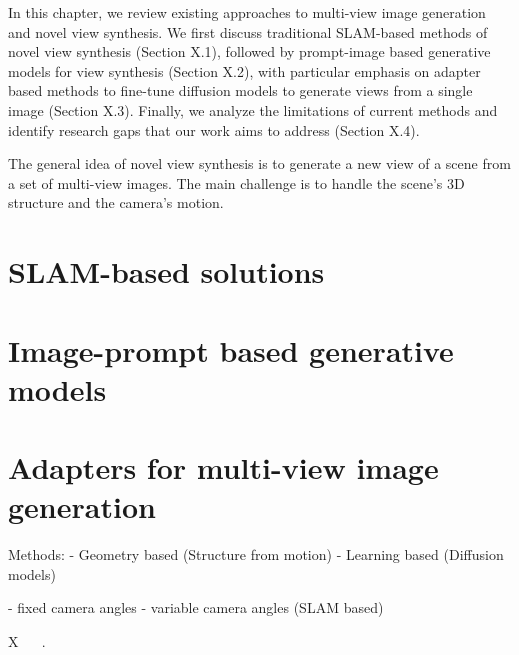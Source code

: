 \label{chapter:related}

In this chapter, we review existing approaches to multi-view image generation and novel view synthesis. We first discuss traditional SLAM-based methods of novel view synthesis (Section X.1), followed by prompt-image based generative models for view synthesis (Section X.2), with particular emphasis on adapter based methods to fine-tune diffusion models to generate views from a single image (Section X.3). Finally, we analyze the limitations of current methods and identify research gaps that our work aims to address (Section X.4).

The general idea of novel view synthesis is to generate a new view of a scene from a set of multi-view images. 
The main challenge is to handle the scene's 3D structure and the camera's motion.



\section{SLAM-based solutions}


\section{Image-prompt based generative models}


\section{Adapters for multi-view image generation}





Methods:
- Geometry based (Structure from motion)
- Learning based (Diffusion models)

- fixed camera angles
- variable camera angles (SLAM based)





X~\cite{multipleviewgeometry} 
~\cite{novelviewsynthesisdiffusion, zero1to3, cat3d, viewcrafter, mvadapter}
\cite{mvadapter}.
